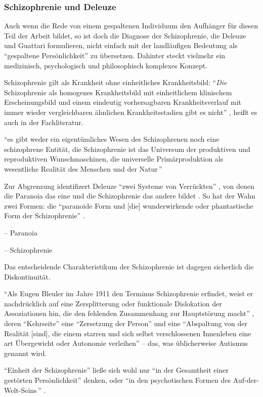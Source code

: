 \documentclass[12pt,
               DIV13,
               paper=a4,
               twoside=false,
               onehalfspacing,
               bibliography=totoc,
               toc=graduated,
               draft,
               ]{scrartcl}
\newcommand{\pc}[2]{\parencite[#1]{#2}}
\newcommand{\vgl}[2]{\parencite[vgl.][#1]{#2}}
\newcommand{\worries}[1]{\ifdraft{\textcolor{blue}{\texttt{(#1)}}}{}}
\begin{document}
\subsubsection{Schizophrenie und Deleuze}

Auch wenn die Rede von einem gespaltenen Individuum den Aufhänger für
diesen Teil der Arbeit bildet, so ist doch die Diagnose der
Schizophrenie, die Deleuze und Guattari formulieren, nicht einfach mit
der landläufigen Bedeutung als "`gespaltene Persönlichkeit"' zu
übersetzen. Dahinter steckt vielmehr ein medizinisch, psychologisch
und philosophisch komplexes Konzept.

Schizophrenie gilt als Krankheit ohne einheitliches Krankheitsbild:
"`\emph{Die} Schizophrenie als homogenes Krankheitsbild mit
einheitlichem klinischem Erscheinungsbild und einem eindeutig
vorhersagbaren Krankheitsverlauf mit immer wieder vergleichbaren
ähnlichen Krankheitsstadien gibt es nicht"' \pc{799}{psych}, heißt es
auch in der Fachliteratur.

"`es gibt weder ein eigentümliches Wesen des Schizophrenen noch eine
schizophrene Entität, die Schizophrenie ist das Universum der
produktiven und reproduktiven Wunschmaschinen, die universelle
Primärproduktion als \glq wesentliche Realität des Menschen und der
Natur\grq\,"' \pc{11}{ao}

Zur Abgrenzung identifizert Deleuze "`zwei Systeme von Verrückten"'
\pc{12}{zweisys}, von denen die Paranoia das eine und die
Schizophrenie das andere bildet \vgl{S. 14 f.}{zweisys}. So hat der
Wahn \worries{?} zwei Formen: die "`paranoide Form und [die]
wunderwirkende oder phantastische Form der Schizophrenie"' \pc{S. 21
f.}{schizg}.

-- Paranoia

-- Schizophrenie

Das entscheidende Charakteristikum der Schizophrenie ist dagegen
sicherlich die Diskontinuität.

"`Als Eugen Bleuler im Jahre 1911 den Terminus Schizophrenie erfindet,
weist er nachdrücklich auf eine Zersplitterung oder funktionale
Dislokation der Assoziationen hin, die den fehlenden Zusammenhang zur
Hauptstörung macht"' \pc{23}{schizg}, deren "`Kehrseite"' eine
"`Zersetzung der Person"' und eine "`Abspaltung von der Realität
[sind], die einem starren und sich selbst verschlossenen Innenleben
eine art Übergewicht oder Autonomie verleihen"' \pc{23}{schizg} --
das, was üblicherweise Autismus genannt wird.

"`Einheit der Schizophrenie"' ließe sich wohl nur "`in der Gesamtheit
einer gestörten Persönlichkeit"' denken, oder "`in den psychotischen
Formen des \glq Auf-der-Welt-Seins\grq\,"' \pc{24}{schizg}.
\end{document}

